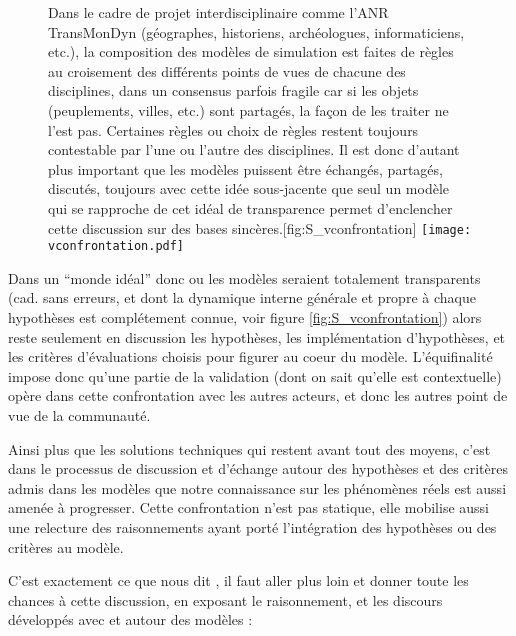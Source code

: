 \begin{figure}[htbp]
\begin{sidecaption}[fortoc]{Dans le cadre de projet interdisciplinaire comme l'ANR TransMonDyn (géographes, historiens, archéologues, informaticiens, etc.), la composition des modèles de simulation est faites de règles au croisement des différents points de vues de chacune des disciplines, dans un consensus parfois fragile car si les objets (peuplements, villes, etc.) sont partagés, la façon de les traiter ne l'est pas. Certaines règles ou choix de règles restent toujours contestable par l’une ou l’autre des disciplines. Il est donc d’autant plus important que les modèles puissent être échangés, partagés, discutés, toujours avec cette idée sous-jacente que seul un modèle qui se rapproche de cet idéal de transparence permet d’enclencher cette discussion sur des bases sincères.}[fig:S_vconfrontation]
  \centering
 \texttt{[image: vconfrontation.pdf]}
  \end{sidecaption}
\end{figure}

Dans un \enquote{monde idéal} donc ou les modèles seraient totalement transparents (cad. sans erreurs, et dont la dynamique interne générale et propre à chaque hypothèses est complétement connue, voir figure \ref{fig:S_vconfrontation}) alors reste seulement en discussion les hypothèses, les implémentation d'hypothèses, et les critères d’évaluations choisis pour figurer au coeur du modèle. L’équifinalité impose donc qu’une partie de la validation (dont on sait qu’elle est contextuelle) opère dans cette confrontation avec les autres acteurs, et donc les autres point de vue de la communauté. 

Ainsi plus que les solutions techniques qui restent avant tout des moyens, c'est dans le processus de discussion et d'échange autour des hypothèses et des critères admis dans les modèles que notre connaissance sur les phénomènes réels est aussi amenée à progresser. Cette confrontation n'est pas statique, elle mobilise aussi une relecture des raisonnements ayant porté l'intégration des hypothèses ou des critères au modèle. %

C'est exactement ce que nous dit \textcite{OSullivan2004}, il faut aller plus loin et donner toute les chances à cette discussion, en exposant le raisonnement, et les discours développés avec et autour des modèles : 

